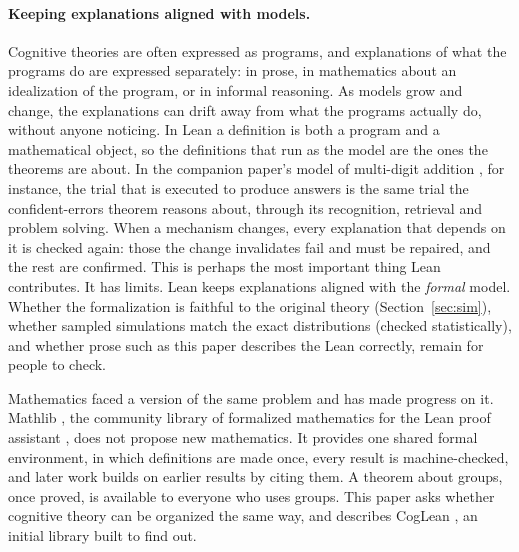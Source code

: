 \documentclass[11pt]{article}
\begin{document}
\paragraph{Keeping explanations aligned with models.} Cognitive theories are often expressed as programs, and explanations of what the programs do are expressed separately: in prose, in mathematics about an idealization of the program, or in informal reasoning. As models grow and change, the explanations can drift away from what the programs actually do, without anyone noticing. In Lean a definition is both a program and a mathematical object, so the definitions that run as the model are the ones the theorems are about. In the companion paper's model of multi-digit addition \citep{shrager2026multidigit}, for instance, the trial that is executed to produce answers is the same trial the confident-errors theorem reasons about, through its recognition, retrieval and problem solving. When a mechanism changes, every explanation that depends on it is checked again: those the change invalidates fail and must be repaired, and the rest are confirmed. This is perhaps the most important thing Lean contributes. It has limits. Lean keeps explanations aligned with the \emph{formal} model. Whether the formalization is faithful to the original theory (Section~\ref{sec:sim}), whether sampled simulations match the exact distributions (checked statistically), and whether prose such as this paper describes the Lean correctly, remain for people to check.

Mathematics faced a version of the same problem and has made progress on it. Mathlib \citep{mathlib2020}, the community library of formalized mathematics for the Lean proof assistant \citep{demoura2021}, does not propose new mathematics. It provides one shared formal environment, in which definitions are made once, every result is machine-checked, and later work builds on earlier results by citing them. A theorem about groups, once proved, is available to everyone who uses groups. This paper asks whether cognitive theory can be organized the same way, and describes CogLean \citep{coglean}, an initial library built to find out.
\end{document}
